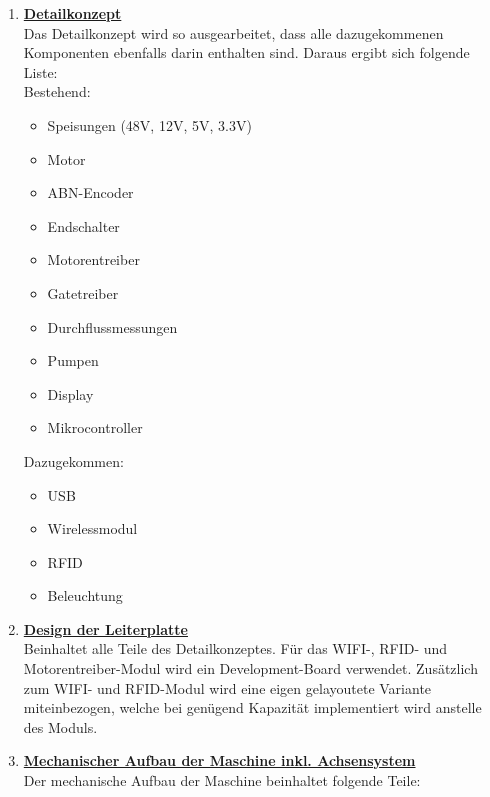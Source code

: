 \begin{enumerate}

\item \underline{\textbf{Detailkonzept}}\mbox{}\\

Das Detailkonzept wird so ausgearbeitet, dass alle dazugekommenen Komponenten ebenfalls darin enthalten sind. Daraus ergibt sich folgende Liste:\\

Bestehend:
\begin{itemize}
\item Speisungen (48V, 12V, 5V, 3.3V)
\item Motor
\item ABN-Encoder
\item Endschalter
\item Motorentreiber
\item Gatetreiber
\item Durchflussmessungen
\item Pumpen
\item Display
\item Mikrocontroller\\
\end{itemize}

Dazugekommen:

\begin{itemize}
\item USB
\item Wirelessmodul
\item RFID
\item Beleuchtung\\
\end{itemize}

\item \underline{\textbf{Design der Leiterplatte}}\mbox{}\\

Beinhaltet alle Teile des Detailkonzeptes. Für das WIFI-, RFID- und Motorentreiber-Modul wird ein Development-Board verwendet. Zusätzlich zum WIFI- und RFID-Modul wird eine eigen gelayoutete Variante miteinbezogen, welche bei genügend Kapazität implementiert wird anstelle des Moduls.\\

\item \underline{\textbf{Mechanischer Aufbau der Maschine inkl. Achsensystem}}\mbox{}\\

Der mechanische Aufbau der Maschine beinhaltet folgende Teile:


\end{enumerate}
